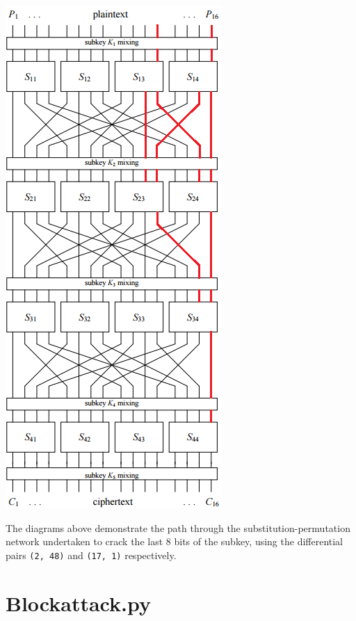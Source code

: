 \documentclass[british,10pt,a4paper]{article}
\begin{document}
\begin{appendices}
  \includegraphics{17,1}

  \hspace{1cm}
  The diagrams above demonstrate the path through the substitution-permutation network undertaken to crack the last 8 bits of the subkey, using the differential pairs \lstinline{(2, 48)} and \lstinline{(17, 1)} respectively.
  \clearpage

  \section{Blockattack.py}\label{app:blockattack}
  
\end{appendices}
\clearpage


\end{document}
